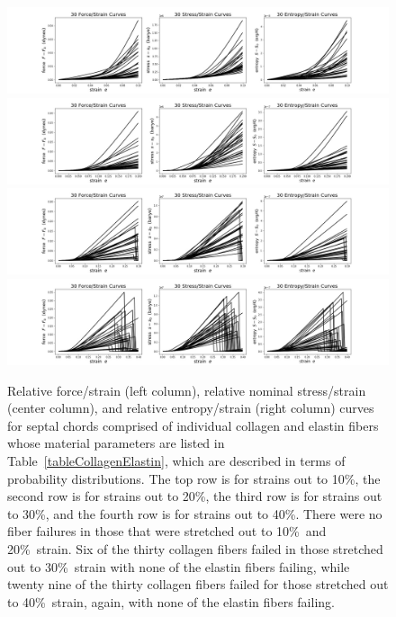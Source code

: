 \begin{figure}
    \mbox{}\hspace{-1.5cm}
    \includegraphics[width=1.2\textwidth]{figures/septalChords10.jpg}
    \mbox{}\hspace{-1.5cm}
    \includegraphics[width=1.2\textwidth]{figures/septalChords20.jpg}
    \mbox{}\hspace{-1.5cm}
    \includegraphics[width=1.2\textwidth]{figures/septalChords30.jpg}
    \mbox{}\hspace{-1.5cm}
    \includegraphics[width=1.2\textwidth]{figures/septalChords40.jpg}
    \caption{Relative force\slash strain (left column), relative nominal stress\slash strain (center column), and relative entropy\slash strain (right column) curves for septal chords comprised of individual collagen and elastin fibers whose material parameters are listed in Table~\ref{tableCollagenElastin}, which are described in terms of probability distributions.  The top row is for strains out to 10\%, the second row is for strains out to 20\%, the third row is for strains out to 30\%, and the fourth row is for strains out to 40\%.  There were no fiber failures in those that were stretched out to 10\%\ and 20\%\ strain.  Six of the thirty collagen fibers failed in those stretched out to 30\%\ strain with none of the elastin fibers failing, while twenty nine of the thirty collagen fibers failed for those stretched out to 40\%\ strain, again, with none of the elastin fibers failing.}
    \label{figStressStrainFibers}
\end{figure}

